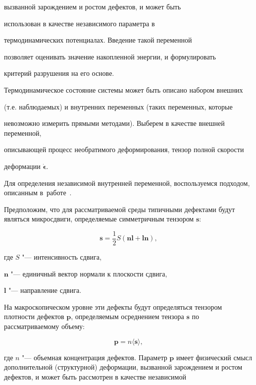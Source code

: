 вызванной зарождением и ростом дефектов, и может быть

использован в качестве независимого параметра в

термодинамических потенциалах. Введение такой переменной

позволяет оценивать значение накопленной энергии, и формулировать

критерий разрушения на его основе.



\smallskip




Термодинамическое состояние системы может быть описано набором внешних

(т.е. наблюдаемых) и внутренних переменных (таких переменных, которые

невозможно измерить прямыми методами). Выберем в качестве внешней переменной,

описывающей процесс необратимого деформирования, тензор полной скорости

деформации $\boldsymbol{\dot{\epsilon}}$.

Для определения независимой внутренней переменной, воспользуемся подходом, описанным в~работе~\cite{kostina:bib:Betekh}.



Предположим, что для рассматриваемой среды типичными дефектами будут являться микросдвиги, определяемые симметричным тензором $\boldsymbol{s}$:

$$

\boldsymbol{s}=\frac{1}{2}S(\boldsymbol{n}\boldsymbol{l}+\boldsymbol{l}\boldsymbol{n}),

$$

где $S$ "---  интенсивность сдвига, 

$\boldsymbol{n}$ "---  единичный вектор нормали к плоскости сдвига, 

$\boldsymbol{l}$ "---  направление сдвига.

На макроскопическом уровне эти дефекты будут определяться тензором плотности дефектов  $\boldsymbol{p}$, определяемым осреднением тензора $\boldsymbol{s}$ по рассматриваемому объему:

$$

\boldsymbol{p}=n \langle \boldsymbol{s} \rangle,

$$

где  $n$ "--- объемная концентрация дефектов. Параметр $\boldsymbol{p}$  имеет физический смысл дополнительной (структурной) деформации, вызванной зарождением и ростом дефектов, и может быть рассмотрен в качестве независимой

